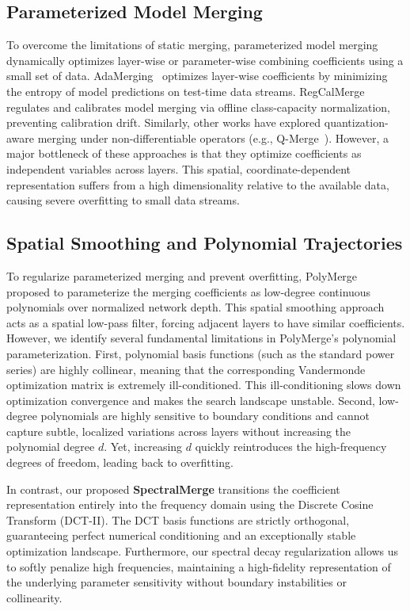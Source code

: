 \subsection{Parameterized Model Merging}
To overcome the limitations of static merging, parameterized model merging dynamically optimizes layer-wise or parameter-wise combining coefficients using a small set of data. AdaMerging~\cite{adamerging} optimizes layer-wise coefficients by minimizing the entropy of model predictions on test-time data streams. RegCalMerge~\cite{regcalmerge} regulates and calibrates model merging via offline class-capacity normalization, preventing calibration drift. Similarly, other works have explored quantization-aware merging under non-differentiable operators (e.g., Q-Merge~\cite{qmerge}). However, a major bottleneck of these approaches is that they optimize coefficients as independent variables across layers. This spatial, coordinate-dependent representation suffers from a high dimensionality relative to the available data, causing severe overfitting to small data streams.

\subsection{Spatial Smoothing and Polynomial Trajectories}
To regularize parameterized merging and prevent overfitting, PolyMerge~\cite{polymerge} proposed to parameterize the merging coefficients as low-degree continuous polynomials over normalized network depth. This spatial smoothing approach acts as a spatial low-pass filter, forcing adjacent layers to have similar coefficients. However, we identify several fundamental limitations in PolyMerge's polynomial parameterization. First, polynomial basis functions (such as the standard power series) are highly collinear, meaning that the corresponding Vandermonde optimization matrix is extremely ill-conditioned. This ill-conditioning slows down optimization convergence and makes the search landscape unstable. Second, low-degree polynomials are highly sensitive to boundary conditions and cannot capture subtle, localized variations across layers without increasing the polynomial degree $d$. Yet, increasing $d$ quickly reintroduces the high-frequency degrees of freedom, leading back to overfitting. 

In contrast, our proposed \textbf{SpectralMerge} transitions the coefficient representation entirely into the frequency domain using the Discrete Cosine Transform (DCT-II). The DCT basis functions are strictly orthogonal, guaranteeing perfect numerical conditioning and an exceptionally stable optimization landscape. Furthermore, our spectral decay regularization allows us to softly penalize high frequencies, maintaining a high-fidelity representation of the underlying parameter sensitivity without boundary instabilities or collinearity.

